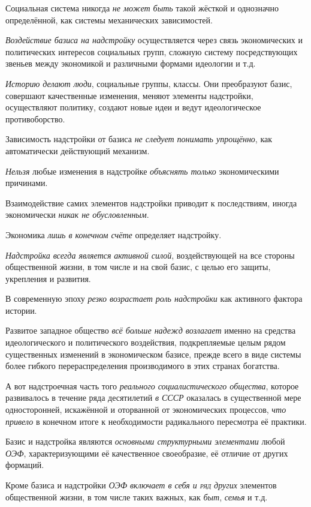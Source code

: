 \documentclass[a4paper,14pt,russian]{extreport}
\begin{document}
Социальная система никогда \emph{не может быть} такой жёсткой и однозначно определённой, как системы механических зависимостей.

\emph{Воздействие базиса на надстройку} осуществляется через связь экономических и политических интересов социальных групп, сложную систему посредствующих звеньев между экономикой и различными формами идеологии и т.д.

\emph{Историю делают люди}, социальные группы, классы. Они преобразуют базис, совершают качественные изменения, меняют элементы надстройки, осуществляют политику, создают новые идеи и ведут идеологическое противоборство.

Зависимость надстройки от базиса \emph{не следует понимать упрощённо}, как автоматически действующий механизм.

\emph{Нельзя} любые изменения в надстройке \emph{объяснять только} экономическими причинами.

Взаимодействие самих элементов надстройки приводит к последствиям, иногда экономически \emph{никак не обусловленным}.

Экономика \emph{лишь в конечном счёте} определяет надстройку.

\emph{Надстройка всегда является} \emph{активной силой}, воздействующей на все стороны общественной жизни, в том числе и на свой базис, с целью его защиты, укрепления и развития.

В современную эпоху \emph{резко возрастает роль надстройки} как активного фактора истории.

Развитое западное общество \emph{всё больше надежд возлагает} именно на средства идеологического и политического воздействия, подкрепляемые целым рядом существенных изменений в экономическом базисе, прежде всего в виде системы более гибкого перераспределения производимого в этих странах богатства.

А вот надстроечная часть того \emph{реального социалистического общества}, которое развивалось в течение ряда десятилетий \emph{в СССР} оказалась в существенной мере односторонней, искажённой и оторванной от экономических процессов, \emph{что привело} в конечном итоге к необходимости радикального пересмотра её практики.

Базис и надстройка являются \emph{основными структурными элементами} любой \emph{ОЭФ}, характеризующими её качественное своеобразие, её отличие от других формаций.

Кроме базиса и надстройки \emph{ОЭФ включает в себя и \textsc{ряд} других} элементов общественной жизни, в том числе таких важных, как \emph{быт}, \emph{семья} и т.д.
\end{document}

